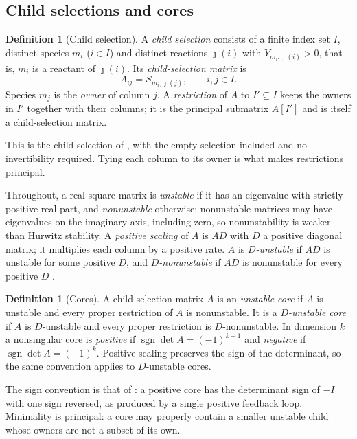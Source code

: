 \documentclass[11pt,a4paper]{article}
\theoremstyle{plain}
\theoremstyle{definition}
\newtheorem{definition}[theorem]{Definition}
\theoremstyle{remark}
\newcommand{\own}{\jmath}
\DeclareMathOperator{\sgn}{sgn}
\begin{document}
\subsection{Child selections and cores}
\begin{definition}[Child selection]\label{def:child}
A \emph{child selection} consists of a finite index set $I$, distinct species $m_i$ ($i\in I$) and distinct reactions $\own(i)$ with $Y_{m_i,\own(i)}>0$, that is, $m_i$ is a reactant of $\own(i)$. Its \emph{child-selection matrix} is
\begin{equation}\label{eq:child}
A_{ij}=S_{m_i,\own(j)},\qquad i,j\in I .
\end{equation}
Species $m_j$ is the \emph{owner} of column $j$. A \emph{restriction} of $A$ to $I'\subseteq I$ keeps the owners in $I'$ together with their columns; it is the principal submatrix $A[I']$ and is itself a child-selection matrix.
\end{definition}

This is the child selection of \citep{BrehmFiedler2018,VassenaStadler2024}, with the empty selection included and no invertibility required. Tying each column to its owner is what makes restrictions principal.

Throughout, a real square matrix is \emph{unstable} if it has an eigenvalue with strictly positive real part, and \emph{nonunstable} otherwise; nonunstable matrices may have eigenvalues on the imaginary axis, including zero, so nonunstability is weaker than Hurwitz stability. A \emph{positive scaling} of $A$ is $AD$ with $D$ a positive diagonal matrix; it multiplies each column by a positive rate. $A$ is \emph{$D$-unstable} if $AD$ is unstable for some positive $D$, and \emph{$D$-nonunstable} if $AD$ is nonunstable for every positive $D$ \citep{Cross1978,Kushel2019}.

\begin{definition}[Cores]\label{def:core}
A child-selection matrix $A$ is an \emph{unstable core} if $A$ is unstable and every proper restriction of $A$ is nonunstable. It is a \emph{$D$-unstable core} if $A$ is $D$-unstable and every proper restriction is $D$-nonunstable. In dimension $k$ a nonsingular core is \emph{positive} if $\sgn\det A=(-1)^{k-1}$ and \emph{negative} if $\sgn\det A=(-1)^{k}$. Positive scaling preserves the sign of the determinant, so the same convention applies to $D$-unstable cores.
\end{definition}

The sign convention is that of \citep{VassenaStadler2024}: a positive core has the determinant sign of $-\!I$ with one sign reversed, as produced by a single positive feedback loop. Minimality is principal: a core may properly contain a smaller unstable child whose owners are not a subset of its own.
\end{document}
